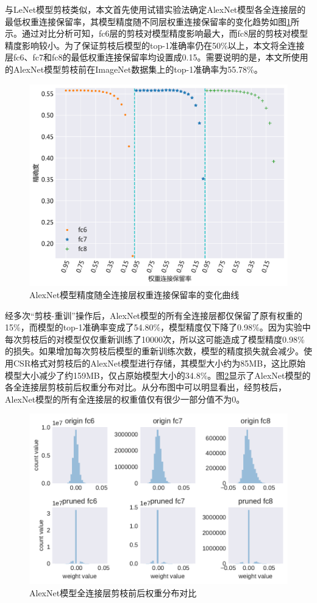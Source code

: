 与LeNet模型剪枝类似，本文首先使用试错实验法确定AlexNet模型各全连接层的最低权重连接保留率，其模型精度随不同层权重连接保留率的变化趋势如图\ref{figure:figure23}所示。通过对比分析可知，fc6层的剪枝对模型精度影响最大，而fc8层的剪枝对模型精度影响较小。为了保证剪枝后模型的top-1准确率仍在50\%以上，本文将全连接层fc6、fc7和fc8的最低权重连接保留率均设置成0.15。需要说明的是，本文所使用的AlexNet模型剪枝前在ImageNet\cite{imagenet.org}数据集上的top-1准确率为55.78\%。

\begin{figure}[htbp]
    \centering
    \includegraphics[height=0.4\textwidth]{figures/alexnet_pruned_threshold.pdf}
    \caption{AlexNet模型精度随全连接层权重连接保留率的变化曲线}\label{figure:figure23}
\end{figure}

经多次“剪枝-重训”操作后，AlexNet模型的所有全连接层都仅保留了原有权重的15\%，而模型的top-1准确率变成了54.80\%，模型精度仅下降了0.98\%。因为实验中每次剪枝后的对模型仅仅重新训练了10000次，所以这可能造成了模型精度0.98\%的损失。如果增加每次剪枝后模型的重新训练次数，模型的精度损失就会减少。使用CSR格式对剪枝后的AlexNet模型进行存储，其模型大小约为85MB，这比原始模型大小减少了约159MB，仅占原始模型大小的34.8\%。图\ref{figure:figure24}显示了AlexNet模型的各全连接层剪枝前后权重分布对比。从分布图中可以明显看出，经剪枝后，AlexNet模型的所有全连接层的权重值仅有很少一部分值不为0。

\begin{figure}[htbp]
    \centering
    \includegraphics[height=0.41\textwidth]{figures/alexnet_pruned_weights.pdf}
    \caption{AlexNet模型全连接层剪枝前后权重分布对比}\label{figure:figure24}
\end{figure}


